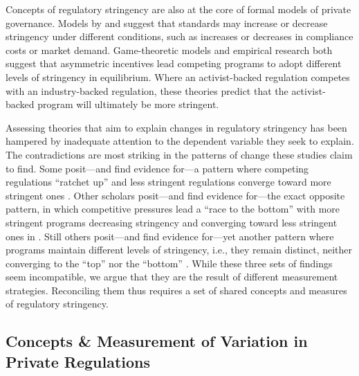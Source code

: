 \documentclass[
      12pt,
            Review ]{article}
\begin{document}
Concepts of regulatory stringency are also at the core of formal models
of private governance. Models by \citet{Abderrazak2009} and
\citet{Fischer2014} suggest that standards may increase or decrease
stringency under different conditions, such as increases or decreases in
compliance costs or market demand. Game-theoretic models
\citep{Fischer2014, Li2015, Poret2016} and empirical research
\citep{Cashore2004} both suggest that asymmetric incentives lead
competing programs to adopt different levels of stringency in
equilibrium. Where an activist-backed regulation competes with an
industry-backed regulation, these theories predict that the
activist-backed program will ultimately be more stringent.

Assessing theories that aim to explain changes in regulatory stringency
has been hampered by inadequate attention to the dependent variable they
seek to explain. The contradictions are most striking in the patterns of
change these studies claim to find. Some posit---and find evidence
for---a pattern where competing regulations ``ratchet up'' and less
stringent regulations converge toward more stringent ones
\citep{Overdevest2005, Overdevest2010, Overdevest2014}. Other scholars
posit---and find evidence for---the exact opposite pattern, in which
competitive pressures lead a ``race to the bottom'' with more stringent
programs decreasing stringency and converging toward less stringent ones
in \citep{Abbott2010, Fransen2011, Gulbrandsen2004}. Still others
posit---and find evidence for---yet another pattern where programs
maintain different levels of stringency, i.e., they remain distinct,
neither converging to the ``top'' nor the ``bottom''
\citep{Fischer2014, Li2015, Poret2016, Cashore2004}. While these three
sets of findings seem incompatible, we argue that they are the result of
different measurement strategies. Reconciling them thus requires a set
of shared concepts and measures of regulatory stringency.

\subsection{Concepts \& Measurement of Variation in Private
Regulations}\label{concepts-measurement-of-variation-in-private-regulations}
\end{document}

